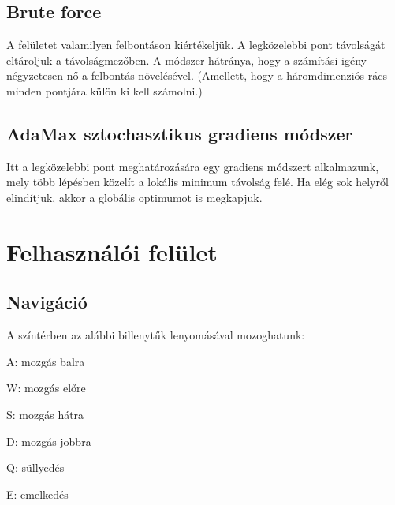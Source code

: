 \subsection{Brute force}
A felületet valamilyen felbontáson kiértékeljük. A legközelebbi pont távolságát eltároljuk a távolságmezőben. A módszer hátránya, hogy a számítási igény négyzetesen nő a felbontás növelésével. (Amellett, hogy a háromdimenziós rács minden pontjára külön ki kell számolni.)

\subsection{AdaMax sztochasztikus gradiens módszer}
Itt a legközelebbi pont meghatározására egy gradiens módszert alkalmazunk, mely több lépésben közelít a lokális minimum távolság felé. Ha elég sok helyről elindítjuk, akkor a globális optimumot is megkapjuk.

\section{Felhasználói felület}

\subsection{Navigáció}
A színtérben az alábbi billenytűk lenyomásával mozoghatunk:
\begin{compactenum}
	\item A: mozgás balra
	\item W: mozgás előre
	\item S: mozgás hátra
	\item D: mozgás jobbra
	\item Q: süllyedés
	\item E: emelkedés
\end{compactenum}

